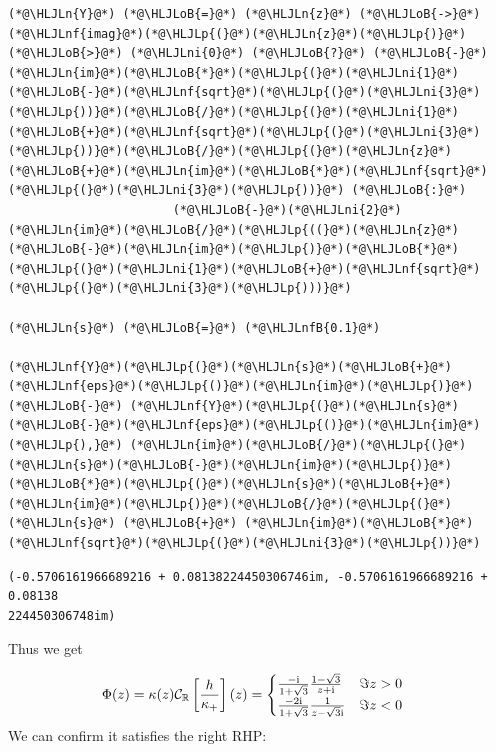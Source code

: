 \documentclass[12pt,a4paper]{article}
\newcommand{\HLJLn}[1]{#1}
\newcommand{\HLJLnf}[1]{\textcolor[RGB]{66,102,213}{#1}}
\newcommand{\HLJLnfB}[1]{\textcolor[RGB]{59,151,46}{#1}}
\newcommand{\HLJLni}[1]{\textcolor[RGB]{59,151,46}{#1}}
\newcommand{\HLJLoB}[1]{\textcolor[RGB]{102,102,102}{\textbf{#1}}}
\newcommand{\HLJLp}[1]{#1}
\def\I{ {\rm i} }
\def\R{ {\mathbb R} }
\def\CC{ {\cal C} }
\def\br[#1]{\left[{#1}\right]}
\begin{document}
\begin{lstlisting}
(*@\HLJLn{Y}@*) (*@\HLJLoB{=}@*) (*@\HLJLn{z}@*) (*@\HLJLoB{->}@*) (*@\HLJLnf{imag}@*)(*@\HLJLp{(}@*)(*@\HLJLn{z}@*)(*@\HLJLp{)}@*) (*@\HLJLoB{>}@*) (*@\HLJLni{0}@*) (*@\HLJLoB{?}@*) (*@\HLJLoB{-}@*)(*@\HLJLn{im}@*)(*@\HLJLoB{*}@*)(*@\HLJLp{(}@*)(*@\HLJLni{1}@*)(*@\HLJLoB{-}@*)(*@\HLJLnf{sqrt}@*)(*@\HLJLp{(}@*)(*@\HLJLni{3}@*)(*@\HLJLp{))}@*)(*@\HLJLoB{/}@*)(*@\HLJLp{(}@*)(*@\HLJLni{1}@*)(*@\HLJLoB{+}@*)(*@\HLJLnf{sqrt}@*)(*@\HLJLp{(}@*)(*@\HLJLni{3}@*)(*@\HLJLp{))}@*)(*@\HLJLoB{/}@*)(*@\HLJLp{(}@*)(*@\HLJLn{z}@*)(*@\HLJLoB{+}@*)(*@\HLJLn{im}@*)(*@\HLJLoB{*}@*)(*@\HLJLnf{sqrt}@*)(*@\HLJLp{(}@*)(*@\HLJLni{3}@*)(*@\HLJLp{))}@*) (*@\HLJLoB{:}@*)
                       (*@\HLJLoB{-}@*)(*@\HLJLni{2}@*)(*@\HLJLn{im}@*)(*@\HLJLoB{/}@*)(*@\HLJLp{((}@*)(*@\HLJLn{z}@*)(*@\HLJLoB{-}@*)(*@\HLJLn{im}@*)(*@\HLJLp{)}@*)(*@\HLJLoB{*}@*)(*@\HLJLp{(}@*)(*@\HLJLni{1}@*)(*@\HLJLoB{+}@*)(*@\HLJLnf{sqrt}@*)(*@\HLJLp{(}@*)(*@\HLJLni{3}@*)(*@\HLJLp{)))}@*)

(*@\HLJLn{s}@*) (*@\HLJLoB{=}@*) (*@\HLJLnfB{0.1}@*)

(*@\HLJLnf{Y}@*)(*@\HLJLp{(}@*)(*@\HLJLn{s}@*)(*@\HLJLoB{+}@*)(*@\HLJLnf{eps}@*)(*@\HLJLp{()}@*)(*@\HLJLn{im}@*)(*@\HLJLp{)}@*) (*@\HLJLoB{-}@*) (*@\HLJLnf{Y}@*)(*@\HLJLp{(}@*)(*@\HLJLn{s}@*)(*@\HLJLoB{-}@*)(*@\HLJLnf{eps}@*)(*@\HLJLp{()}@*)(*@\HLJLn{im}@*)(*@\HLJLp{),}@*) (*@\HLJLn{im}@*)(*@\HLJLoB{/}@*)(*@\HLJLp{(}@*)(*@\HLJLn{s}@*)(*@\HLJLoB{-}@*)(*@\HLJLn{im}@*)(*@\HLJLp{)}@*)(*@\HLJLoB{*}@*)(*@\HLJLp{(}@*)(*@\HLJLn{s}@*)(*@\HLJLoB{+}@*)(*@\HLJLn{im}@*)(*@\HLJLp{)}@*)(*@\HLJLoB{/}@*)(*@\HLJLp{(}@*)(*@\HLJLn{s}@*) (*@\HLJLoB{+}@*) (*@\HLJLn{im}@*)(*@\HLJLoB{*}@*)(*@\HLJLnf{sqrt}@*)(*@\HLJLp{(}@*)(*@\HLJLni{3}@*)(*@\HLJLp{))}@*)
\end{lstlisting}

\begin{lstlisting}
(-0.5706161966689216 + 0.08138224450306746im, -0.5706161966689216 + 0.08138
224450306748im)
\end{lstlisting}


Thus we get


\begin{align*}
\Phi(z)  &= \kappa(z) \CC_\R\br[{h \over \kappa_+}](z) = \begin{cases} 
{-\I \over 1+\sqrt 3} {1-\sqrt 3 \over z+\I} & \Im z > 0 \\
{-2 \I  \over 1+ \sqrt{3}} {1 \over z-\sqrt{3}\I} & \Im z < 0
\end{cases}
\end{align*}
We can confirm it satisfies the right RHP:
\end{document}
